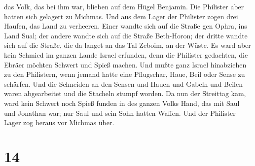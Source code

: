 das Volk, das bei ihm war, blieben auf dem Hügel Benjamin. Die Philister
aber hatten sich gelagert zu Michmas.  Und aus dem Lager
der Philister zogen drei Haufen, das Land zu verheeren. Einer wandte
sich auf die Straße gen Ophra, ins Land Sual;  der andere
wandte sich auf die Straße Beth-Horon; der dritte wandte sich auf die
Straße, die da langet an das Tal Zeboim, an der Wüste.  Es
ward aber kein Schmied im ganzen Lande Israel erfunden, denn die
Philister gedachten, die Ebräer möchten Schwert und Spieß machen.
 Und mußte ganz Israel hinabziehen zu den Philistern, wenn
jemand hatte eine Pflugschar, Haue, Beil oder Sense zu schärfen.
 Und die Schneiden an den Sensen und Hauen und Gabeln und
Beilen waren abgearbeitet und die Stacheln stumpf worden. 
Da nun der Streittag kam, ward kein Schwert noch Spieß funden in des
ganzen Volks Hand, das mit Saul und Jonathan war; nur Saul und sein Sohn
hatten Waffen.  Und der Philister Lager zog heraus vor
Michmas über.

\hypertarget{section-13}{%
\section{14}\label{section-13}}

